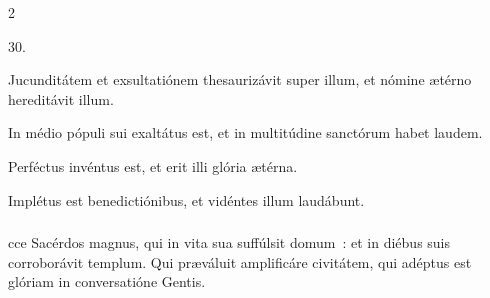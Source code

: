 \documentclass[9pt,twoside]{extarticle}
\begin{document}
\begin{multicols}{2}
{{\begin{tightlist}{}
\item {} 30.
\item {} Jucunditátem et exsultatiónem thesaurizávit super illum, et nómine ætérno hereditávit illum.
\item {} In médio pópuli sui exaltátus est, et in multitúdine sanctórum habet laudem.
\item {} Perféctus invéntus est, et erit illi glória ætérna.
\item {} Implétus est benedictiónibus, et vidéntes illum laudábunt.
\end{tightlist}

\subsubsection*{}
cce Sacérdos magnus, qui in vita sua suffúlsit domum~: et in diébus suis corroborávit templum. Qui præváluit amplificáre civitátem, qui adéptus est glóriam in conversatióne Gentis.

}}
\end{multicols}
\end{document}
